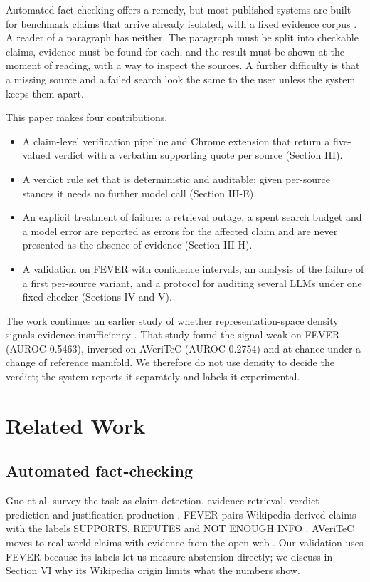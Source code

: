 \documentclass[conference]{IEEEtran}
\begin{document}
Automated fact-checking offers a remedy, but most published systems are built for benchmark claims that arrive already isolated, with a fixed evidence corpus \cite{guo2022,thorne2018}. A reader of a paragraph has neither. The paragraph must be split into checkable claims, evidence must be found for each, and the result must be shown at the moment of reading, with a way to inspect the sources. A further difficulty is that a missing source and a failed search look the same to the user unless the system keeps them apart.

This paper makes four contributions.

\begin{itemize}
\item A claim-level verification pipeline and Chrome extension that return a five-valued verdict with a verbatim supporting quote per source (Section III).
\item A verdict rule set that is deterministic and auditable: given per-source stances it needs no further model call (Section III-E).
\item An explicit treatment of failure: a retrieval outage, a spent search budget and a model error are reported as errors for the affected claim and are never presented as the absence of evidence (Section III-H).
\item A validation on FEVER \cite{thorne2018} with confidence intervals, an analysis of the failure of a first per-source variant, and a protocol for auditing several LLMs under one fixed checker (Sections IV and V).
\end{itemize}

The work continues an earlier study of whether representation-space density signals evidence insufficiency \cite{ss2026}. That study found the signal weak on FEVER (AUROC 0.5463), inverted on AVeriTeC (AUROC 0.2754) and at chance under a change of reference manifold. We therefore do not use density to decide the verdict; the system reports it separately and labels it experimental.

\section{Related Work}
\subsection{Automated fact-checking}

Guo et al. survey the task as claim detection, evidence retrieval, verdict prediction and justification production \cite{guo2022}. FEVER pairs Wikipedia-derived claims with the labels SUPPORTS, REFUTES and NOT ENOUGH INFO \cite{thorne2018}. AVeriTeC moves to real-world claims with evidence from the open web \cite{schlichtkrull2023}. Our validation uses FEVER because its labels let us measure abstention directly; we discuss in Section VI why its Wikipedia origin limits what the numbers show.
\end{document}
